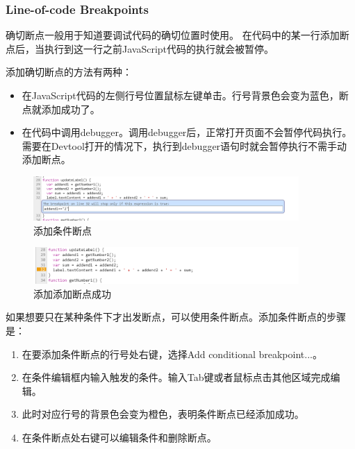 \subsubsection{Line-of-code Breakpoints}
确切断点一般用于知道要调试代码的确切位置时使用。
在代码中的某一行添加断点后，当执行到这一行之前JavaScript代码的执行就会被暂停。

添加确切断点的方法有两种：
\begin{itemize}
\item 在JavaScript代码的左侧行号位置鼠标左键单击。行号背景色会变为蓝色，断点就添加成功了。
\item 在代码中调用debugger。调用debugger后，正常打开页面不会暂停代码执行。
需要在Devtool打开的情况下，执行到debugger语句时就会暂停执行不需手动添加断点。
\end{itemize}

\begin{figure}[H] 
\centering 
\includegraphics[width=0.9\textwidth]{image/devtools_study/add_conditional_breakpoint1.png} 
\caption{添加条件断点} \label{fig:add_conditional_breakpoint1} 
\end{figure}

\begin{figure}[H] 
\centering 
\includegraphics[width=0.9\textwidth]{image/devtools_study/add_conditional_breakpoint2.png} 
\caption{添加添加断点成功} \label{fig:add_conditional_breakpoint2} 
\end{figure}

如果想要只在某种条件下才出发断点，可以使用条件断点。添加条件断点的步骤是：
\begin{enumerate}
\item 在要添加条件断点的行号处右键，选择Add conditional breakpoint...。
\item 在条件编辑框内输入触发的条件。输入Tab键或者鼠标点击其他区域完成编辑。
\item 此时对应行号的背景色会变为橙色，表明条件断点已经添加成功。
\item 在条件断点处右键可以编辑条件和删除断点。
\end{enumerate}

